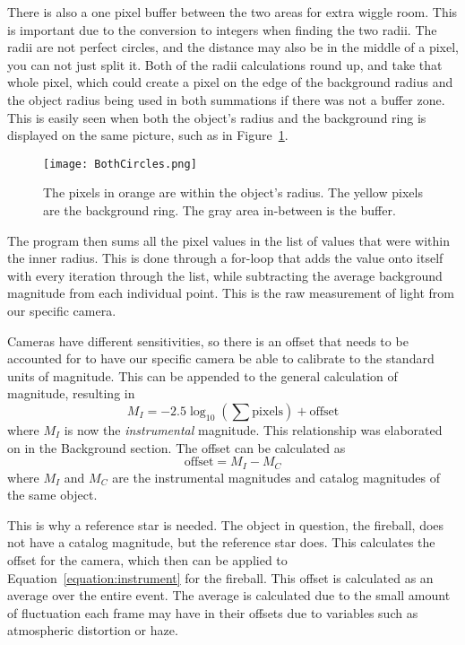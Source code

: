 There is also a one pixel buffer between the two areas for extra wiggle room. This is important due to the conversion to integers when finding the two radii. The radii are not perfect circles, and the distance may also be in the middle of a pixel, you can not just split it. Both of the radii calculations round up, and take that whole pixel, which could create a pixel on the edge of the background radius and the object radius being used in both summations if there was not a buffer zone. This is easily seen when both the object's radius and the background ring is displayed on the same picture, such as in Figure~\ref{fig:BothCircles}.

\begin{figure}[ht!]
	\centering
	\texttt{[image: BothCircles.png]}
	\caption{The pixels in orange are within the object's radius. The yellow pixels are the background ring. The gray area in-between is the buffer.}
	\label{fig:BothCircles}
\end{figure}

The program then sums all the pixel values in the list of values that were within the inner radius. This is done through a for-loop that adds the value onto itself with every iteration through the list, while subtracting the average background magnitude from each individual point. This is the raw measurement of light from our specific camera.

Cameras have different sensitivities, so there is an offset that needs to be accounted for to have our specific camera be able to calibrate to the standard units of magnitude. This can be appended to the general calculation of magnitude, resulting in 
\begin{equation}
	M_I = -2.5 \log_{10}\left( \sum \text{pixels}\right) + \text{offset}
	\label{equation:instrument}
\end{equation}
where $M_I$ is now the \textit{instrumental} magnitude. This relationship was elaborated on in the Background section. The offset can be calculated as
\begin{equation}
	\text{offset} = M_I - M_C
	\label{equation:offset}
\end{equation}
where $M_I$ and $M_C$ are the instrumental magnitudes and catalog magnitudes of the same object.

This is why a reference star is needed. The object in question, the fireball, does not have a catalog magnitude, but the reference star does. This calculates the offset for the camera, which then can be applied to Equation~\ref{equation:instrument} for the fireball. This offset is calculated as an average over the entire event. The average is calculated due to the small amount of fluctuation each frame may have in their offsets due to variables such as atmospheric distortion or haze.

